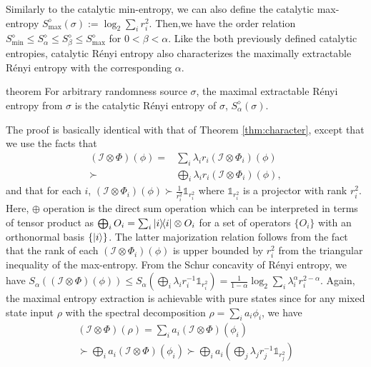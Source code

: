 \documentclass[aps, reprint, amsmath,amssymb, prx, superscriptaddress]{revtex4-2}
\begin{document}
Similarly to the catalytic min-entropy, we can also define the catalytic max-entropy $S_{\max{}}^\diamond(\sigma):=\log_2  \sum_i r_i^2.$ Then,we have the order relation $S_{\min{}}^\diamond\leq S_{\alpha}^\diamond \leq S_\beta^\diamond \leq S_{\max{}}^\diamond$ for $0<\beta<\alpha$.  Like the both previously defined catalytic entropies, catalytic R\'{e}nyi entropy also characterizes the maximally extractable R\'{e}nyi entropy with the corresponding $\alpha$.
\begin{theoremEnd}{theorem} \label{thm:traderen}
    For arbitrary randomness source $\sigma$, the maximal extractable R\'{e}nyi entropy from $\sigma$ is the catalytic R\'{e}nyi entropy of $\sigma$, $S_{\alpha}^\diamond(\sigma)$.
\end{theoremEnd}
\begin{proofEnd}
    The proof is basically identical with that of Theorem \ref{thm:character}, except that we use the  facts \cite{nielsen2000probability} that 
    \begin{align}
        (\mathcal{I}\otimes \Phi)(\phi) =& \sum_i \lambda_i r_i (\mathcal{I}\otimes \Phi_i)(\phi)\\
        \succ& \bigoplus_i \lambda_i r_i (\mathcal{I}\otimes \Phi_i)(\phi),
    \end{align}
     and that for each $i$, $(\mathcal{I}\otimes \Phi_i)(\phi) \succ \frac{1}{r_i^2} \mathds{1}_{r_i^2}$ where $\mathds{1}_{r_i^2}$ is a projector with rank $r_i^2$. Here, $\oplus$ operation is the direct sum operation which can be interpreted in terms of tensor product as $\bigoplus_i O_i = \sum_i \dyad{i}\otimes O_i$ for a set of operators $\{O_i\}$ with an orthonormal basis $\{\ket{i}\}$. The latter majorization relation follows from the fact that the rank of each $(\mathcal{I}\otimes \Phi_i)(\phi)$ is upper bounded by $r_i^2$ from the triangular inequality of the max-entropy. From the Schur concavity of R\'{e}nyi entropy, we have $S_\alpha((\mathcal{I}\otimes \Phi)(\phi))\leq S_\alpha(\bigoplus_i \lambda_i r_i^{-1}\mathds{1}_{r_i^2})=\frac{1}{1-\alpha} \log_2  \sum_i \lambda_i^\alpha r_i^{2-\alpha}.$ Again, the maximal entropy extraction is achievable with pure states since for any mixed state input $\rho$ with the spectral decomposition $\rho=\sum_i a_i \phi_i$, we have 
    \begin{gather}
        (\mathcal{I}\otimes \Phi)(\rho) =\sum_i a_i (\mathcal{I}\otimes \Phi)(\phi_i)\\
        \succ \bigoplus_i a_i (\mathcal{I}\otimes \Phi)(\phi_i) \succ \bigoplus_i a_i \left(\bigoplus_j \lambda_jr_j^{-1}\mathds{1}_{r_j^2} \right)\\

\end{gather}
\end{proofEnd}
\end{document}
